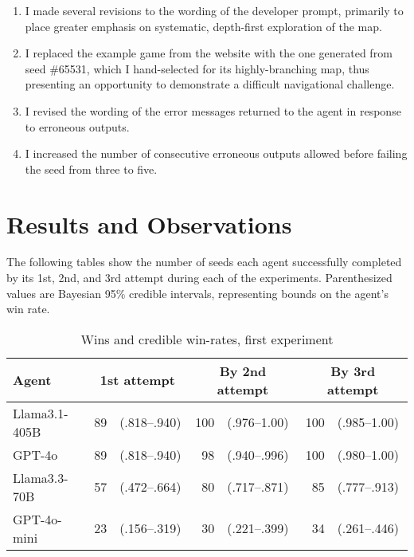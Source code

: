 \documentclass{article}
\begin{document}
\begin{enumerate}
  \item I made several revisions to the wording of the developer
    prompt, primarily
    to place greater emphasis on systematic, depth-first exploration of the map.
  \item I replaced the example game from the website with the one generated from
    seed \#65531, which I hand-selected for its highly-branching map,
    thus presenting
    an opportunity to demonstrate a difficult navigational challenge.
  \item I revised the wording of the error messages returned to the agent in
    response to erroneous outputs.
  \item I increased the number of consecutive erroneous outputs allowed before
    failing the seed from three to five.
\end{enumerate}

\section{Results and Observations}

The following tables show the number of seeds each agent successfully completed
by its 1st, 2nd, and 3rd attempt during each of the experiments. Parenthesized
values are Bayesian 95\% credible intervals, representing bounds on the agent's
win rate.

\begin{table}[h]
  \begin{center}
    \begin{tabular}{|l|rl|rl|rl|}
      \hline
      \textbf{Agent} & \multicolumn{2}{c|}{\textbf{1st attempt}} &
      \multicolumn{2}{c|}{\textbf{By 2nd attempt}} &
      \multicolumn{2}{c|}{\textbf{By 3rd attempt}} \\
      \hline
      Llama3.1-405B & 89 & (.818--.940) & 100 & (.976--1.00) & 100 &
      (.985--1.00) \\
      GPT-4o & 89 & (.818--.940) & 98 & (.940--.996) & 100 & (.980--1.00) \\
      Llama3.3-70B & 57 & (.472--.664) & 80 & (.717--.871) & 85 &
      (.777--.913) \\
      GPT-4o-mini & 23 & (.156--.319) & 30 & (.221--.399) & 34 & (.261--.446) \\
      \hline
    \end{tabular}
  \end{center}
  \caption{Wins and credible win-rates, first experiment}
\end{table}
\end{document}
